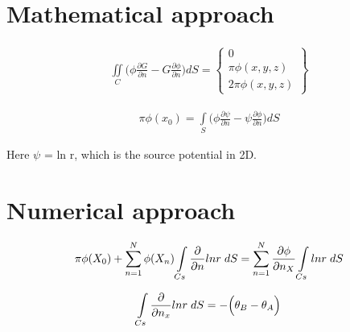 \documentclass[a4paper,norsk]{article}
\begin{document}
\maketitle

\section*{Mathematical approach}
\begin{align*}
\iint\limits_C \Big(\phi \frac{\partial G}{\partial n} - G\frac{\partial \phi}{\partial n}\Big) dS =
\begin{Bmatrix}
0 \\ \pi \phi(x,y,z) \\ 2\pi \phi (x,y,z)
\end{Bmatrix}
\end{align*}


\begin{align*}
\pi \phi(x_0) = \int\limits_S \Big(\phi \frac{\partial \psi}{\partial n} - \psi \frac{\partial \phi}{\partial n} \Big) dS
\end{align*}

Here $\psi$ = ln r, which is the source potential in 2D. 

\newpage
\section*{Numerical approach}

\begin{align*}
\pi \phi(X_0) + \sum_{n=1}^N \phi(X_n) \int\limits_{Cs} \frac{\partial}{\partial n} ln r \hspace{1mm}dS = 
\sum_{n=1}^N \frac{\partial \phi}{\partial n_{X}} \int\limits_{Cs} ln r \hspace{1mm} dS
\end{align*}


\begin{align*}
\int\limits_{Cs} \frac{\partial}{\partial n_x} ln r \hspace{1mm}dS = -\Big(\theta_B - \theta_A \Big)
\end{align*}
\end{document}
